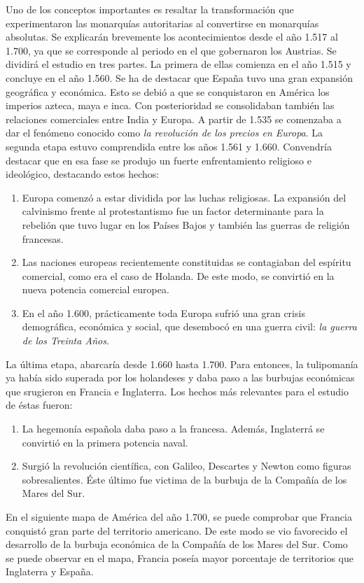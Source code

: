 Uno de los conceptos importantes es resaltar la transformación que experimentaron las monarquías autoritarias al convertirse en monarquías absolutas. 
Se explicarán brevemente los acontecimientos desde el año 1.517 al 1.700, ya que se corresponde al periodo en el que gobernaron los Austrias. Se dividirá el estudio en tres partes. La primera de ellas comienza en el año 1.515 y concluye en el año 1.560. Se ha de destacar que España tuvo una gran expansión geográfica y económica. Esto se debió a que se conquistaron en América los imperios azteca, maya e inca. Con posterioridad se consolidaban también las relaciones comerciales entre India y Europa. A partir de 1.535 se comenzaba a dar el fenómeno conocido como \emph{la revolución de los precios en Europa}.
La segunda etapa estuvo comprendida entre los años 1.561 y 1.660. Convendría destacar que en esa fase se produjo un fuerte enfrentamiento religioso e ideológico, destacando estos hechos:
\begin{enumerate}
	\item Europa comenzó a estar dividida por las luchas religiosas. La expansión del calvinismo frente al protestantismo fue un factor determinante para la rebelión que tuvo lugar en los Países Bajos y también las guerras de religión francesas. 
	\item Las naciones europeas recientemente constituidas se contagiaban del espíritu comercial, como era el caso de Holanda. De este modo, se convirtió en la nueva potencia comercial europea.
	\item En el año 1.600, prácticamente toda Europa sufrió una gran crisis demográfica, económica y social, que desembocó en una guerra civil: \emph{la guerra de los Treinta Años}.
\end{enumerate} 
La última etapa, abarcaría desde 1.660 hasta 1.700. Para entonces, la tulipomanía ya había sido superada por los holandeses y daba paso a las burbujas económicas que srugieron en Francia e Inglaterra. Los hechos más relevantes para el estudio de éstas fueron:
\begin{enumerate}
	\item La hegemonía española daba paso a la francesa. Además, Inglaterrá se convirtió en la primera potencia naval. 
	\item Surgió la revolución científica, con Galileo, Descartes y Newton como figuras sobresalientes. Éste último fue victima de la burbuja de la Compañía de los Mares del Sur.
\end{enumerate}

En el siguiente mapa de América del año 1.700, se puede comprobar que Francia conquistó gran parte del territorio americano. De este modo se vio favorecido el desarrollo de la burbuja económica de la Compañía de los Mares del Sur. Como se puede observar en el mapa, Francia poseía mayor porcentaje de territorios que Inglaterra y España.

